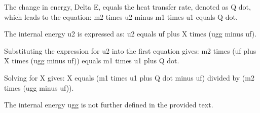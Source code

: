 The change in energy, Delta E, equals the heat transfer rate, denoted as Q dot, which leads to the equation:
m2 times u2 minus m1 times u1 equals Q dot.

The internal energy u2 is expressed as:
u2 equals uf plus X times (ugg minus uf).

Substituting the expression for u2 into the first equation gives:
m2 times (uf plus X times (ugg minus uf)) equals m1 times u1 plus Q dot.

Solving for X gives:
X equals (m1 times u1 plus Q dot minus uf) divided by (m2 times (ugg minus uf)).

The internal energy ugg is not further defined in the provided text.